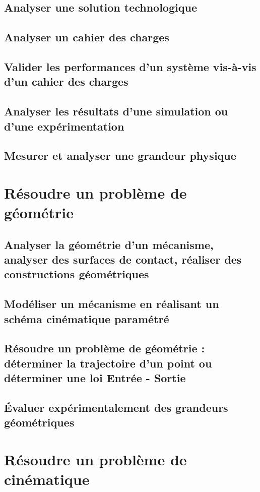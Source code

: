 \section{Analyser une solution technologique} 
\section{Analyser un cahier des charges} 
\section{Valider les performances d'un système vis-à-vis d'un cahier des charges} 
\section{Analyser les résultats d'une simulation ou d'une expérimentation} 
\section{Mesurer et analyser une grandeur physique} 
\setchapterpreamble[u]{\margintoc} 
\chapter{Résoudre un problème de géométrie} 
\section{Analyser la géométrie d'un mécanisme, analyser des surfaces de contact, réaliser des constructions géométriques} 
\section{Modéliser un mécanisme en réalisant un schéma cinématique paramétré} 
\section{Résoudre un problème de géométrie : déterminer la trajectoire d'un point ou déterminer une loi Entrée - Sortie} 
\section{Évaluer expérimentalement des grandeurs géométriques} 
\setchapterpreamble[u]{\margintoc} 
\chapter{Résoudre un problème de cinématique} 
